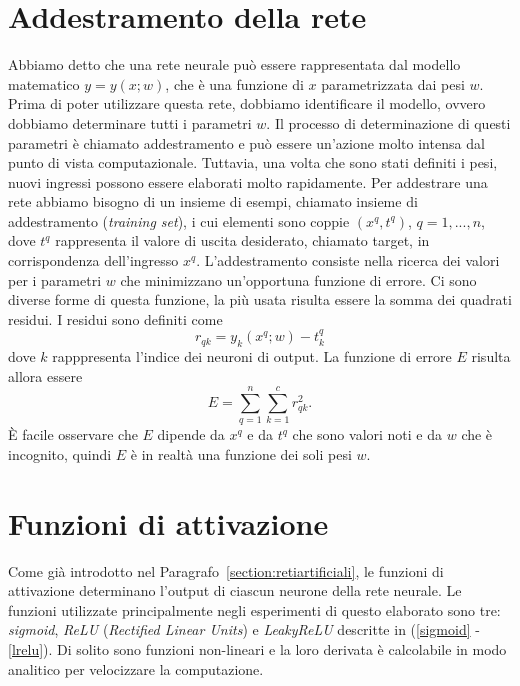 \documentclass[11pt,a4paper,twoside,
openright]{book}
\begin{document}
\section{Addestramento della rete}
\label{addestramento}
Abbiamo detto che una rete neurale può essere rappresentata dal modello matematico $y = y(x; w)$, che è una funzione di $x$ parametrizzata dai pesi $w$. Prima di poter utilizzare questa rete, dobbiamo identificare il modello, ovvero dobbiamo determinare tutti i parametri $w$. Il processo di determinazione di questi parametri è chiamato addestramento e può essere un’azione molto intensa dal punto di vista computazionale. Tuttavia, una volta che sono stati definiti i pesi, nuovi ingressi possono essere elaborati molto rapidamente.
Per addestrare una rete abbiamo bisogno di un insieme di esempi, chiamato insieme di addestramento (\textit{training set}), i cui elementi sono coppie $(x^{q}, t^{q})$, $q = 1, ..., n$, dove $t^{q}$ rappresenta il valore di uscita desiderato, chiamato target, in corrispondenza dell'ingresso $x^{q}$. 
L’addestramento consiste nella ricerca dei valori per i parametri $w$ che minimizzano un’opportuna funzione di errore. Ci sono diverse forme di questa funzione, la più usata risulta essere la somma dei quadrati residui. I residui sono definiti come
\begin{equation}
r_{qk} = y_{k}\left(x^{q}; w\right) - t^{q}_{k}
\label{res}
\end{equation}
dove $k$ rapppresenta l'indice dei neuroni di output.
La funzione di errore $E$ risulta allora essere
\begin{equation}
E = \sum\limits_{q=1}^n \sum\limits_{k=1}^c r_{qk}^{2}. 
\label{quadres}
\end{equation}
\`E facile osservare che $E$ dipende da $x^{q}$ e da $t^{q}$ che sono valori noti e da $w$ che è incognito, quindi $E$ è in realtà una funzione dei soli pesi $w$.

\section{Funzioni di attivazione}
Come già introdotto nel Paragrafo~\ref{section:retiartificiali}, le funzioni di attivazione determinano l'output di ciascun neurone della rete neurale.
Le funzioni utilizzate principalmente negli esperimenti di questo elaborato sono tre: \textit{sigmoid}, \textit{ReLU} (\textit{Rectified Linear Units}) e \textit{LeakyReLU} descritte in (\ref{sigmoid} -\ref{lrelu}).
Di solito sono funzioni non-lineari e la loro derivata è calcolabile in modo analitico per velocizzare la computazione.
\end{document}

